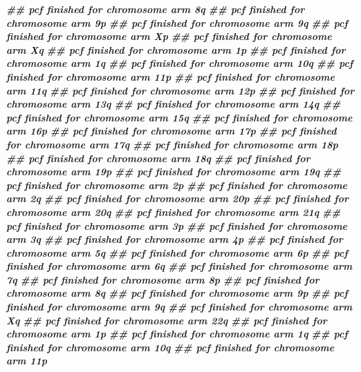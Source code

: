 \documentclass[
  12pt,
  a4paper,
  twoside]{book}
\newenvironment{Shaded}{\begin{snugshade}}{\end{snugshade}}
\newcommand{\DocumentationTok}[1]{\textcolor[rgb]{0.56,0.35,0.01}{\textbf{\textit{#1}}}}
\begin{document}
\begin{Shaded}
\begin{Highlighting}[]
\DocumentationTok{\#\# pcf finished for chromosome arm 8q }
\DocumentationTok{\#\# pcf finished for chromosome arm 9p }
\DocumentationTok{\#\# pcf finished for chromosome arm 9q }
\DocumentationTok{\#\# pcf finished for chromosome arm Xp }
\DocumentationTok{\#\# pcf finished for chromosome arm Xq }
\DocumentationTok{\#\# pcf finished for chromosome arm 1p }
\DocumentationTok{\#\# pcf finished for chromosome arm 1q }
\DocumentationTok{\#\# pcf finished for chromosome arm 10q }
\DocumentationTok{\#\# pcf finished for chromosome arm 11p }
\DocumentationTok{\#\# pcf finished for chromosome arm 11q }
\DocumentationTok{\#\# pcf finished for chromosome arm 12p }
\DocumentationTok{\#\# pcf finished for chromosome arm 13q }
\DocumentationTok{\#\# pcf finished for chromosome arm 14q }
\DocumentationTok{\#\# pcf finished for chromosome arm 15q }
\DocumentationTok{\#\# pcf finished for chromosome arm 16p }
\DocumentationTok{\#\# pcf finished for chromosome arm 17p }
\DocumentationTok{\#\# pcf finished for chromosome arm 17q }
\DocumentationTok{\#\# pcf finished for chromosome arm 18p }
\DocumentationTok{\#\# pcf finished for chromosome arm 18q }
\DocumentationTok{\#\# pcf finished for chromosome arm 19p }
\DocumentationTok{\#\# pcf finished for chromosome arm 19q }
\DocumentationTok{\#\# pcf finished for chromosome arm 2p }
\DocumentationTok{\#\# pcf finished for chromosome arm 2q }
\DocumentationTok{\#\# pcf finished for chromosome arm 20p }
\DocumentationTok{\#\# pcf finished for chromosome arm 20q }
\DocumentationTok{\#\# pcf finished for chromosome arm 21q }
\DocumentationTok{\#\# pcf finished for chromosome arm 3p }
\DocumentationTok{\#\# pcf finished for chromosome arm 3q }
\DocumentationTok{\#\# pcf finished for chromosome arm 4p }
\DocumentationTok{\#\# pcf finished for chromosome arm 5q }
\DocumentationTok{\#\# pcf finished for chromosome arm 6p }
\DocumentationTok{\#\# pcf finished for chromosome arm 6q }
\DocumentationTok{\#\# pcf finished for chromosome arm 7q }
\DocumentationTok{\#\# pcf finished for chromosome arm 8p }
\DocumentationTok{\#\# pcf finished for chromosome arm 8q }
\DocumentationTok{\#\# pcf finished for chromosome arm 9p }
\DocumentationTok{\#\# pcf finished for chromosome arm 9q }
\DocumentationTok{\#\# pcf finished for chromosome arm Xq }
\DocumentationTok{\#\# pcf finished for chromosome arm 22q }
\DocumentationTok{\#\# pcf finished for chromosome arm 1p }
\DocumentationTok{\#\# pcf finished for chromosome arm 1q }
\DocumentationTok{\#\# pcf finished for chromosome arm 10q }
\DocumentationTok{\#\# pcf finished for chromosome arm 11p }

\end{Highlighting}
\end{Shaded}
\end{document}
